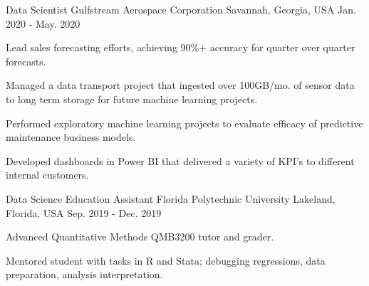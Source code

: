 

\begin{cventries}

  \cventry
    {Data Scientist} %
    {Gulfstream Aerospace Corporation} %
    {Savannah, Georgia, USA} %
    {Jan. 2020 - May. 2020} %
    {
      \begin{cvitems} %
        \item {Lead sales forecasting efforts, achieving 90\%+ accuracy for quarter over quarter forecasts.}
        \item {Managed a data transport project that ingested over 100GB/mo. of sensor data to long term storage for future machine learning projects.}
        \item {Performed exploratory machine learning projects to evaluate efficacy of predictive maintenance business models.}
        \item {Developed dashboards in Power BI that delivered a variety of KPI's to different internal customers.}
      \end{cvitems}
    }

  \cventry
    {Data Science Education Assistant} %
    {Florida Polytechnic University} %
    {Lakeland, Florida, USA} %
    {Sep. 2019 - Dec. 2019} %
    {
      \begin{cvitems} %
        \item {Advanced Quantitative Methods QMB3200 tutor and grader.}
        \item {Mentored student with tasks in R and Stata; debugging regressions, data preparation, analysis interpretation.}
      \end{cvitems}
    }


\end{cventries}
